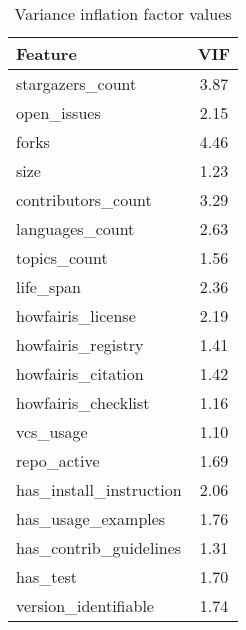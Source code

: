 \begin{table}
\centering
\caption{Variance inflation factor values}
\label{tab:vif}
\begin{tabular}{lc}
\toprule
                Feature &  VIF \\
\midrule
       stargazers\_count & 3.87 \\
            open\_issues & 2.15 \\
                  forks & 4.46 \\
                   size & 1.23 \\
     contributors\_count & 3.29 \\
        languages\_count & 2.63 \\
           topics\_count & 1.56 \\
              life\_span & 2.36 \\
      howfairis\_license & 2.19 \\
     howfairis\_registry & 1.41 \\
     howfairis\_citation & 1.42 \\
    howfairis\_checklist & 1.16 \\
              vcs\_usage & 1.10 \\
            repo\_active & 1.69 \\
has\_install\_instruction & 2.06 \\
     has\_usage\_examples & 1.76 \\
 has\_contrib\_guidelines & 1.31 \\
               has\_test & 1.70 \\
   version\_identifiable & 1.74 \\
\bottomrule
\end{tabular}
\end{table}
